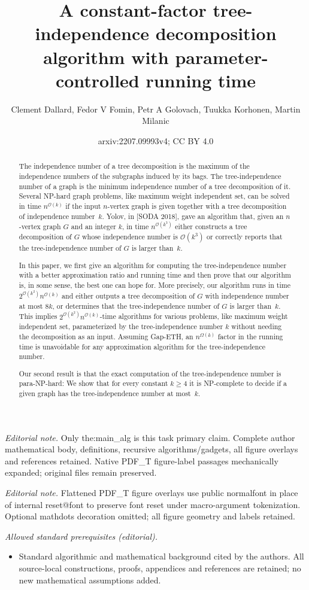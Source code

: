 \documentclass[11pt]{article}
\date{}
\title{A constant-factor tree-independence decomposition algorithm with parameter-controlled running time}
\author{Clement Dallard, Fedor V Fomin, Petr A Golovach, Tuukka Korhonen, Martin Milanic}
\date{arxiv:2207.09993v4; CC BY 4.0}
\theoremstyle{definition}
\newcommand{\NP}{\textup{\textsf{NP}}}
\newcommand{\parNP}{\textup{\textsf{para-NP}}}
\newcommand{\OO}{\mathcal{O}}
\begin{document}
\maketitle
\noindent\textit{Editorial note.} Only the:main\_alg is this task primary claim. Complete author mathematical body, definitions, recursive algorithms/gadgets, all figure overlays and references retained. Native PDF\_T figure-label passages mechanically expanded; original files remain preserved.\par\medskip
\noindent\textit{Editorial note.} Flattened PDF\_T figure overlays use public normalfont in place of internal reset@font to preserve font reset under macro-argument tokenization. Optional mathdots decoration omitted; all figure geometry and labels retained.\par\medskip
\noindent\textit{Allowed standard prerequisites (editorial).}\begin{itemize}
\item Standard algorithmic and mathematical background cited by the authors. All source-local constructions, proofs, appendices and references are retained; no new mathematical assumptions added.
\end{itemize}\medskip



\begin{abstract}
The independence number of a tree decomposition is the maximum of the independence numbers of the subgraphs induced by its bags.
The tree-independence number of a graph is the minimum independence number of a tree decomposition of it.
Several \NP-hard graph problems, like maximum weight independent set, can be solved in time $n^{\OO(k)}$ if the input $n$-vertex graph is given together with a tree decomposition of independence number~$k$.
Yolov, in [SODA 2018], gave an algorithm that, given an $n$-vertex graph $G$ and an integer $k$, in time
$n^{\OO(k^3)}$ either constructs a tree decomposition of $G$ whose independence number is $\OO(k^3)$ or correctly reports that
the tree-independence number of $G$ is larger than~$k$.


In this paper, we first give an algorithm for computing the tree-independence number with a better approximation ratio and running time and then prove that our algorithm is, in some sense, the best one can hope for.
More precisely, our algorithm runs in time $2^{\OO(k^2)} n^{\OO(k)}$ and either outputs a tree decomposition of $G$ with independence number at most $8k$, or determines that the tree-independence number of $G$ is larger than~$k$.
This implies $2^{\OO(k^2)} n^{\OO(k)}$-time algorithms for various problems, like maximum weight independent set, parameterized by the tree-independence number $k$ without needing the decomposition as an input.
Assuming Gap-ETH, an $n^{\Omega(k)}$ factor in the running time is unavoidable for any approximation algorithm for the tree-independence number.

Our second result is that the exact computation of the tree-independence number is \parNP-hard: We show that for every constant $k \ge 4$ it is \NP-complete to decide if a given graph has the tree-independence number at most~$k$.
\end{abstract}
\end{document}
